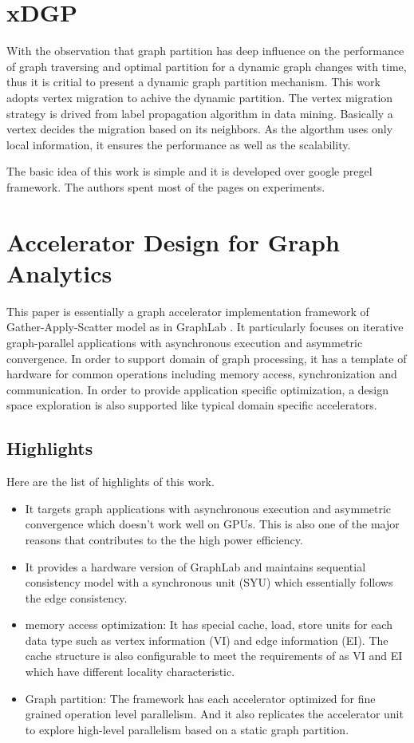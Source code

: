 
\section{xDGP}
With the observation that graph partition has deep influence on the performance of graph traversing and optimal partition for a dynamic graph changes with time, thus it is critial to present a dynamic graph partition mechanism. This work \cite{vaquero2013xdgp} adopts vertex migration to achive the dynamic partition. The vertex migration strategy is drived from label propagation algorithm in data mining. Basically a vertex decides the migration based on its neighbors. As the algorthm uses only local information, it
ensures the performance as well as the scalability. 

The basic idea of this work is simple and it is developed over google pregel framework. The authors spent most of the pages on experiments.   

\section{Accelerator Design for Graph Analytics}
This paper \cite{ozdal2016energy} is essentially a graph accelerator implementation framework of Gather-Apply-Scatter model as in GraphLab \cite{nurvitadhi2014graphgen}. It particularly focuses on iterative graph-parallel applications with asynchronous
execution and asymmetric convergence. In order to support domain of graph processing, it has a
template of hardware for common operations including memory access, synchronization and
communication. In order to provide application specific optimization, a design space exploration is
also supported like typical domain specific accelerators.

\subsection{Highlights}
Here are the list of highlights of this work.
\begin{itemize}
    \item It targets graph applications with asynchronous execution and asymmetric convergence which
        doesn't work well on GPUs. This is also one of the major reasons that contributes to the the high power efficiency.
    \item It provides a hardware version of GraphLab \cite{nurvitadhi2014graphgen} and maintains sequential consistency model with a synchronous unit (SYU) which essentially follows the edge consistency. 
    \item memory access optimization: It has special cache, load, store units for each data type such as vertex information (VI) and edge information (EI). The cache structure is also configurable to meet the requirements of as VI and EI which have different locality characteristic. 
    \item Graph partition: The framework has each accelerator optimized for fine grained operation level parallelism. And it also replicates the accelerator unit to explore high-level parallelism based on a static graph partition.
\end{itemize}

